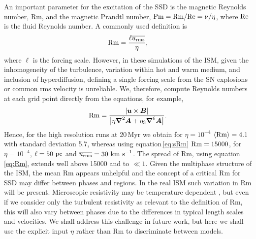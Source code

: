 \documentclass[preprint2]{aastex63}
\newcommand\Rm{{\rm Rm} }
\newcommand\Rey{{\rm Re} }
\newcommand\Pm{{\rm Pm} }
\newcommand{\vect}[1]{{{\mbox{\boldmath $#1$}}}}%
\newcommand\pc{~ {\rm pc}}
\newcommand\kms{~ {\rm km~ s}^{-1}}
\begin{document}
An important 
parameter for the excitation of the SSD
is the magnetic Reynolds number, Rm,
and the magnetic Prandtl number, $\Pm = \Rm/\Rey = \nu/\eta$, where $\Rey$
is the fluid Reynolds number.
A commonly used definition is 
\begin{equation}\label{eq:sRm}
\Rm=\frac{\ell \overline{u_{\rm rms}}}{\eta},
\end{equation}
where $\ell$ is the forcing scale.
However, in these simulations of the ISM, given the 
inhomogeneity of the 
turbulence, variation within hot and warm medium, and inclusion of
hyperdiffusion, defining a single forcing scale from the SN explosions or 
common rms velocity is unreliable.
We, therefore, compute Reynolds numbers at each grid point
directly from the equations,
for example,
\begin{eqnarray}\label{eq:Rm}
  \Rm = \frac{\left|\vect{u}\times\vect{B}\right|}{
    \left|\eta\vect\nabla^2\vect{A}+\eta_3\vect\nabla^6\vect{A}\right|}.
\end{eqnarray}
Hence, for the high resolution runs at 20\,Myr we obtain for $\eta=10^{-4}$ 
$\langle\Rm\rangle=4.1$ with standard deviation 5.7, whereas using
equation\,\eqref{eq:sRm} 
$\Rm = 15000$, for $\eta=10^{-4}$, $\ell=50\pc$ and
$\overline{u_{\rm rms}}=30\kms$.
The spread of Rm, using equation\,\eqref{eq:Rm}, extends well above 15000 and to
$\ll1$.
Given the multiphase structure of the ISM, the mean Rm appears unhelpful and 
the concept of a critical Rm for SSD may differ between phases and regions.
In the real ISM such variation in Rm will be present.
Microscopic resistivity may be temperature dependent \citep{CSR50}, but even if
we consider only the turbulent resistivity as relevant to the definition of 
Rm, this will also vary between phases due to the differences in typical 
length scales and velocities.
We shall address this challenge in future work, but here we shall use the 
explicit input $\eta$ rather than Rm to discriminate between models.
%
\end{document}
